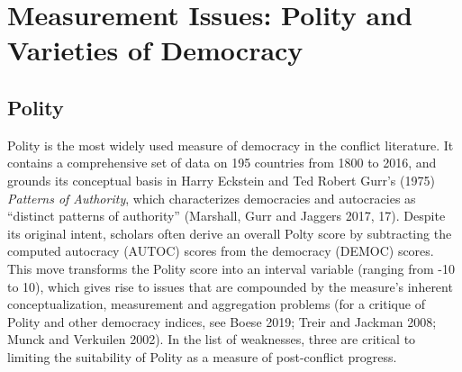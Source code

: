 \documentclass [11pt]{article}
\begin{document}

\section*{Measurement Issues: Polity and Varieties of Democracy}

 \subsection*{Polity}

Polity is the most widely used measure of democracy in the conflict literature. It contains a comprehensive set of data on 195 countries from 1800 to 2016, and grounds its conceptual basis in Harry Eckstein and Ted Robert Gurr's (1975) \emph{Patterns of Authority}, which characterizes democracies and autocracies as ``distinct patterns of authority'' (Marshall, Gurr and Jaggers 2017, 17). Despite its original intent, scholars often derive an overall Polty score by subtracting the computed autocracy (AUTOC) scores from the democracy (DEMOC) scores. This move transforms the Polity score into an interval variable (ranging from -10 to 10), which gives rise to issues that are compounded by the measure's inherent conceptualization, measurement and aggregation problems (for a critique of Polity and other democracy indices, see Boese 2019; Treir and Jackman 2008; Munck and Verkuilen 2002). In the list of weaknesses, three are critical to limiting the suitability of Polity as a measure of post-conflict progress.
\end{document}
